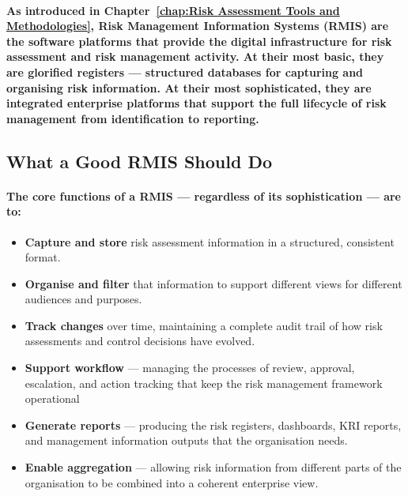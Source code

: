\paragraph{As introduced in Chapter~\ref{chap:Risk Assessment Tools and Methodologies}, \textbf{Risk Management Information Systems (RMIS)} are the software platforms that provide the digital infrastructure for risk assessment and risk management activity. At their most basic, they are glorified registers — structured databases for capturing and organising risk information. At their most sophisticated, they are integrated enterprise platforms that support the full lifecycle of risk management from identification to reporting.}

\subsection{What a Good RMIS Should Do}
\paragraph{The core functions of a RMIS — regardless of its sophistication — are to:}
\begin{itemize}
    \item{\textbf{Capture and store} risk assessment information in a structured, consistent format.}
    \item{\textbf{Organise and filter} that information to support different views for different audiences and purposes.}
    \item{\textbf{Track changes} over time, maintaining a complete audit trail of how risk assessments and control decisions have evolved.}
    \item{\textbf{Support workflow} — managing the processes of review, approval, escalation, and action tracking that keep the risk management framework operational}
    \item{\textbf{Generate reports} — producing the risk registers, dashboards, KRI reports, and management information outputs that the organisation needs.}
    \item{\textbf{Enable aggregation} — allowing risk information from different parts of the organisation to be combined into a coherent enterprise view.}
\end{itemize}
